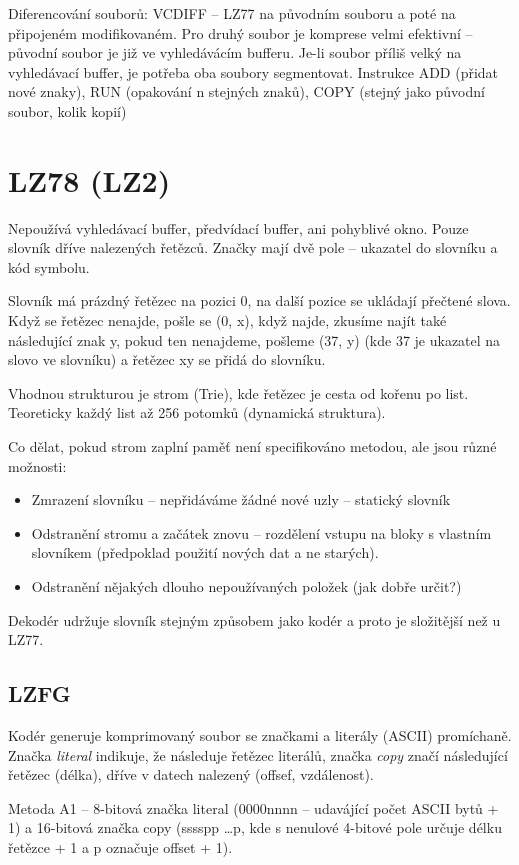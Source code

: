 \documentclass[a4paper, 11pt]{report}
\begin{document}
Diferencování souborů: VCDIFF -- LZ77 na původním souboru a poté na připojeném modifikovaném. Pro druhý soubor je komprese velmi efektivní -- původní soubor je již ve vyhledávácím bufferu. Je-li soubor příliš velký na vyhledávací buffer, je potřeba oba soubory segmentovat. Instrukce ADD (přidat nové znaky), RUN (opakování n stejných znaků), COPY (stejný jako původní soubor, kolik kopií)

\section{LZ78 (LZ2)}
Nepoužívá vyhledávací buffer, předvídací buffer, ani pohyblivé okno. Pouze slovník dříve nalezených řetězců. Značky mají dvě pole -- ukazatel do slovníku a kód symbolu.

Slovník má prázdný řetězec na pozici 0, na další pozice se ukládají přečtené slova. Když se řetězec nenajde, pošle se (0, x), když najde, zkusíme najít také následující znak y, pokud ten nenajdeme, pošleme (37, y) (kde 37 je ukazatel na slovo  ve slovníku) a řetězec xy se přidá do slovníku.

Vhodnou strukturou je strom (Trie), kde řetězec je cesta od kořenu po list. Teoreticky každý list až 256 potomků (dynamická struktura).

Co dělat, pokud strom zaplní paměť není specifikováno metodou, ale jsou různé možnosti:
\begin{itemize}
	\item Zmrazení slovníku -- nepřidáváme žádné nové uzly -- statický slovník
	\item Odstranění stromu a začátek znovu -- rozdělení vstupu na bloky s vlastním slovníkem (předpoklad použití nových dat a ne starých).
	\item Odstranění nějakých dlouho nepoužívaných položek (jak dobře určit?)
\end{itemize}

Dekodér udržuje slovník stejným způsobem jako kodér a proto je složitější než u LZ77.

\subsection{LZFG}
Kodér generuje komprimovaný soubor se značkami a literály (ASCII) promíchaně. Značka \emph{literal} indikuje, že následuje řetězec literálů, značka \emph{copy} značí následující řetězec (délka), dříve v datech nalezený (offsef, vzdálenost).

Metoda A1 -- 8-bitová značka literal (0000nnnn -- udavájící počet ASCII bytů + 1) a 16-bitová značka copy (sssspp \dots p, kde s nenulové 4-bitové pole určuje délku řetězce + 1 a p označuje offset + 1).
\end{document}
